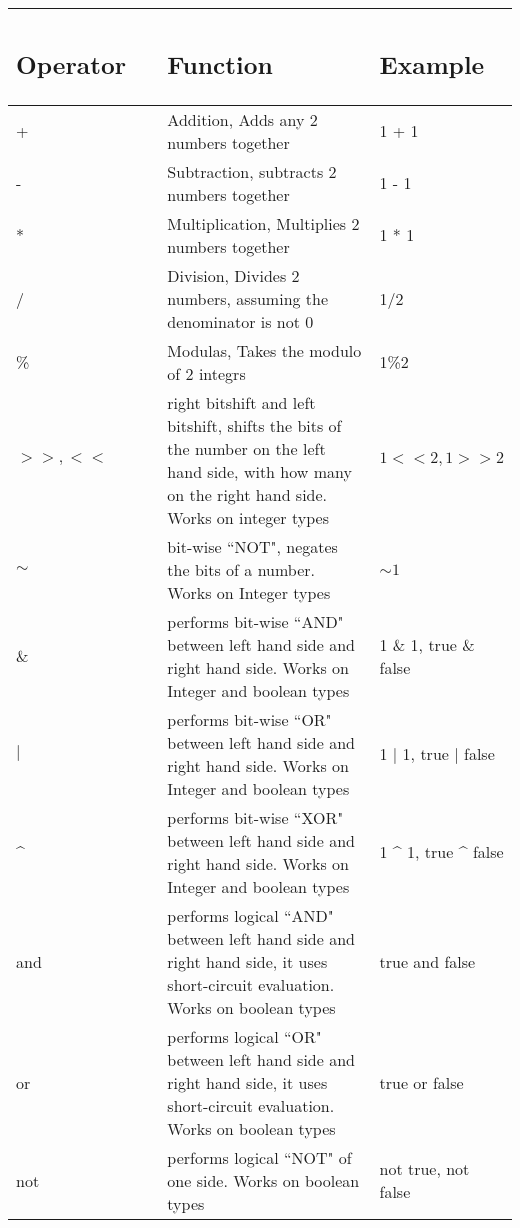 \documentclass{article}
\begin{document}
\begin{table}[H]
    \centering
    \begin{tabular}{p{0.35\linewidth} | p{0.6\linewidth}| p{0.6\linewidth} }
      
\subsection*{Operator} & \subsection*{Function} & \subsection*{Example}
 \\ \hline
    + & Addition, Adds any 2 numbers together & 1 + 1 \\ \hline
    - & Subtraction, subtracts 2 numbers together  & 1 - 1 \\ \hline
    * & Multiplication, Multiplies 2 numbers together & 1 * 1\\ \hline
    / & Division, Divides 2 numbers, assuming the denominator is not 0 & 1/2 \\ \hline
    \% & Modulas, Takes the modulo of 2 integrs & 1\%2 \\ \hline
    $>>,<<$ & right bitshift and left bitshift, shifts the bits of the number on the left hand side, with how many on the right hand side. Works on integer types & $1 << 2, 1 >> 2$  \\ \hline   
    $\sim$ & bit-wise ``NOT", negates the bits of a number. Works on Integer types & $\sim1$  \\ \hline     
    $\&$ & performs bit-wise ``AND" between left hand side and right hand side. Works on Integer and boolean types & 1 $\&$ 1, true $\&$ false  \\ \hline   
    $|$ & performs bit-wise ``OR" between left hand side and right hand side. Works on Integer and boolean types & 1 $|$ 1, true $|$ false   \\ \hline   
    \^{ } & performs bit-wise ``XOR" between left hand side and right hand side. Works on Integer and boolean types & 1 \^{ } 1, true  \^{ } false   \\ \hline   
    and & performs logical ``AND" between left hand side and right hand side, it uses short-circuit evaluation. Works on boolean types & true and false   \\ \hline   
    or & performs logical ``OR" between left hand side and right hand side, it uses short-circuit evaluation. Works on  boolean types & true or false   \\ \hline   
    not & performs logical ``NOT" of one side. Works on  boolean types & not true, not false   \\ \hline   

    \end{tabular}
       
\end{table}
\end{document}
